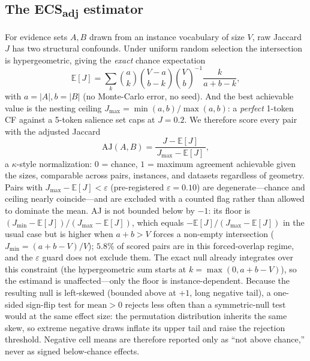 \documentclass[11pt]{article}
\newcommand{\ecsadj}{\mbox{ECS\textsubscript{adj}}}
\newcommand{\aj}{\mathrm{AJ}}
\begin{document}
\subsection{The \ecsadj{} estimator}
\label{sec:ecsadj}

For evidence sets $A,B$ drawn from an instance vocabulary of size $V$, raw Jaccard $J$ has two structural confounds. Under uniform random selection the intersection is hypergeometric, giving the \emph{exact} chance expectation
\begin{equation}
\mathbb{E}[J] = \sum_{k} \binom{a}{k}\binom{V-a}{b-k}\binom{V}{b}^{-1}\frac{k}{a+b-k},
\end{equation}
with $a{=}|A|, b{=}|B|$ (no Monte-Carlo error, no seed). And the best achievable value is the nesting ceiling $J_{\max}=\min(a,b)/\max(a,b)$: a \emph{perfect} 1-token CF against a 5-token salience set caps at $J=0.2$. We therefore score every pair with the adjusted Jaccard
\begin{equation}
\aj(A,B)=\frac{J-\mathbb{E}[J]}{\,J_{\max}-\mathbb{E}[J]\,},
\end{equation}
a $\kappa$-style normalization: $0$ = chance, $1$ = maximum agreement achievable given the sizes, comparable across pairs, instances, and datasets regardless of geometry. Pairs with $J_{\max}-\mathbb{E}[J]<\varepsilon$ (pre-registered $\varepsilon=0.10$) are degenerate---chance and ceiling nearly coincide---and are excluded with a counted flag rather than allowed to dominate the mean. AJ is not bounded below by $-1$: its floor is $(J_{\min}-\mathbb{E}[J])/(J_{\max}-\mathbb{E}[J])$, which equals $-\mathbb{E}[J]/(J_{\max}-\mathbb{E}[J])$ in the usual case but is higher when $a+b>V$ forces a non-empty intersection ($J_{\min}=(a+b-V)/V$); $5.8\%$ of scored pairs are in this forced-overlap regime, and the $\varepsilon$ guard does not exclude them. The exact null already integrates over this constraint (the hypergeometric sum starts at $k=\max(0,a+b-V)$), so the estimand is unaffected---only the floor is instance-dependent. Because the resulting null is left-skewed (bounded above at $+1$, long negative tail), a one-sided sign-flip test for $\mathrm{mean}>0$ rejects less often than a symmetric-null test would at the same effect size: the permutation distribution inherits the same skew, so extreme negative draws inflate its upper tail and raise the rejection threshold. Negative cell means are therefore reported only as ``not above chance,'' never as signed below-chance effects.
\end{document}

